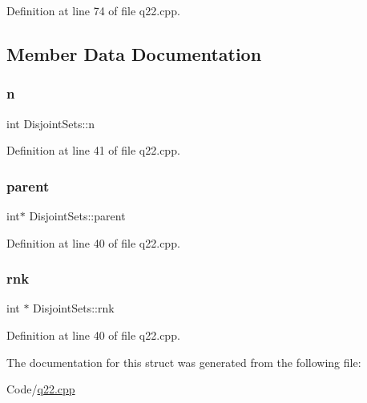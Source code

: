 Definition at line 74 of file q22.\+cpp.



\subsection{Member Data Documentation}
\mbox{\label{struct_disjoint_sets_aeb43c9e003e2bd5b83b5c60d56dfd23e}} 
\subsubsection{\texorpdfstring{n}{n}}
{\footnotesize\ttfamily int Disjoint\+Sets\+::n}



Definition at line 41 of file q22.\+cpp.

\mbox{\label{struct_disjoint_sets_ad7f9caf9365a04a1c6670aa372a3cdbd}} 
\subsubsection{\texorpdfstring{parent}{parent}}
{\footnotesize\ttfamily int$\ast$ Disjoint\+Sets\+::parent}



Definition at line 40 of file q22.\+cpp.

\mbox{\label{struct_disjoint_sets_a93f26d80d2fb349bd97793fb41e502e8}} 
\subsubsection{\texorpdfstring{rnk}{rnk}}
{\footnotesize\ttfamily int $\ast$ Disjoint\+Sets\+::rnk}



Definition at line 40 of file q22.\+cpp.



The documentation for this struct was generated from the following file\+:\begin{DoxyCompactItemize}
\item 
Code/\hyperlink{q22_8cpp}{q22.\+cpp}\end{DoxyCompactItemize}

